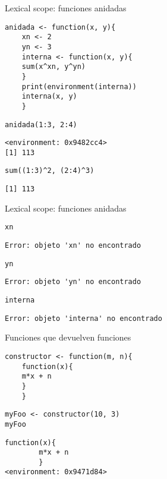\documentclass[xcolor={usenames,svgnames,dvipsnames}]{beamer}
\begin{document}
\begin{frame}[fragile,label=sec-2-3]{Lexical scope: funciones anidadas}
 \lstset{language=R,numbers=none}
\begin{lstlisting}
anidada <- function(x, y){
    xn <- 2
    yn <- 3
    interna <- function(x, y){
	sum(x^xn, y^yn)
	}
    print(environment(interna))
    interna(x, y)
    }
\end{lstlisting}

\lstset{language=R,numbers=none}
\begin{lstlisting}
anidada(1:3, 2:4)
\end{lstlisting}

\begin{verbatim}
<environment: 0x9482cc4>
[1] 113
\end{verbatim}

\lstset{language=R,numbers=none}
\begin{lstlisting}
sum((1:3)^2, (2:4)^3)
\end{lstlisting}

\begin{verbatim}
[1] 113
\end{verbatim}
\end{frame}
\begin{frame}[fragile,label=sec-2-4]{Lexical scope: funciones anidadas}
 \lstset{language=R,numbers=none}
\begin{lstlisting}
xn
\end{lstlisting}

\begin{verbatim}
Error: objeto 'xn' no encontrado
\end{verbatim}

\lstset{language=R,numbers=none}
\begin{lstlisting}
yn
\end{lstlisting}

\begin{verbatim}
Error: objeto 'yn' no encontrado
\end{verbatim}

\lstset{language=R,numbers=none}
\begin{lstlisting}
interna
\end{lstlisting}

\begin{verbatim}
Error: objeto 'interna' no encontrado
\end{verbatim}
\end{frame}
\begin{frame}[fragile,label=sec-2-5]{Funciones que devuelven funciones}
 \lstset{language=R,numbers=none}
\begin{lstlisting}
constructor <- function(m, n){
    function(x){
	m*x + n
	}
    }
\end{lstlisting}

\lstset{language=R,numbers=none}
\begin{lstlisting}
myFoo <- constructor(10, 3)
myFoo
\end{lstlisting}

\begin{verbatim}
function(x){
        m*x + n
        }
<environment: 0x9471d84>
\end{verbatim}
\end{frame}
\end{document}

